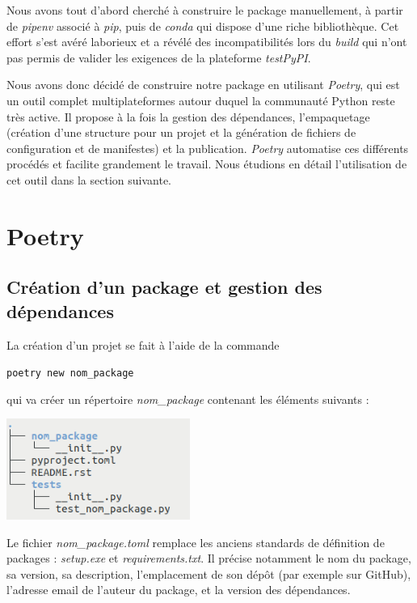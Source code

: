 \documentclass[twoside,a4paper,11pt,frenchb,openany]{report}
\begin{document}
Nous avons tout d'abord cherché à construire le package manuellement, à partir de \textit{pipenv} associé à \textit{pip}, puis de \textit{conda} qui dispose d'une riche bibliothèque. Cet effort s'est avéré laborieux et a révélé des incompatibilités lors du \textit{build} qui n'ont pas permis de valider les exigences de la plateforme \textit{testPyPI}.

Nous avons donc décidé de construire notre package en utilisant \textit{Poetry}, qui est un outil complet multiplateformes autour duquel la communauté Python reste très active. Il propose à la fois la gestion des dépendances, l'empaquetage (création d'une structure pour un projet et la génération de fichiers de configuration et de manifestes) et la publication. \textit{Poetry} automatise ces différents procédés et facilite grandement le travail. Nous étudions en détail l'utilisation de cet outil dans la section suivante.
	

\section{Poetry}


\subsection{Création d'un package et gestion des dépendances}

La création d'un projet se fait à l'aide de la commande
\begin{tcolorbox}\texttt{poetry new nom\_package}\end{tcolorbox}
qui va créer un répertoire \textit{nom\_package} contenant les éléments suivants :

\includegraphics[width=6cm]{nom_package_tree.png}

Le fichier \textit{nom\_package.toml} remplace les anciens standards de définition de packages : \textit{setup.exe} et \textit{requirements.txt}. Il précise notamment le nom du package, sa version, sa description, l’emplacement de son dépôt (par exemple sur GitHub), l’adresse email de l’auteur du package, et la version des dépendances.
\end{document}
